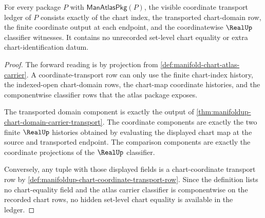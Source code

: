 \begin{theorem}
\label{thm:manifoldup-chart-coordinate-ledger-exactness}
For every package $P$ with $\mathsf{ManAtlasPkg}(P)$, the visible coordinate
transport ledger of $P$ consists exactly of the chart index, the transported
chart-domain row, the finite coordinate output at each endpoint, and the
coordinatewise $\RealUp$ classifier witnesses. It contains no unrecorded
set-level chart equality or extra chart-identification datum.
\end{theorem}
\begin{proof}
The forward reading is by projection from
\autoref{def:manifold-chart-atlas-carrier}. A coordinate-transport row can only
use the finite chart-index history, the indexed-open chart-domain rows, the
chart-map coordinate histories, and the componentwise classifier rows that the
atlas package exposes.

The transported domain component is exactly the output of
\autoref{thm:manifoldup-chart-domain-carrier-transport}. The coordinate
components are exactly the two finite $\RealUp$ histories obtained by
evaluating the displayed chart map at the source and transported endpoint. The
comparison components are exactly the coordinate projections of the
$\RealUp$ classifier.

Conversely, any tuple with those displayed fields is a chart-coordinate
transport row by
\autoref{def:manifoldup-chart-coordinate-transport-row}. Since the definition
lists no chart-equality field and the atlas carrier classifier is
componentwise on the recorded chart rows, no hidden set-level chart equality is
available in the ledger.
\end{proof}
